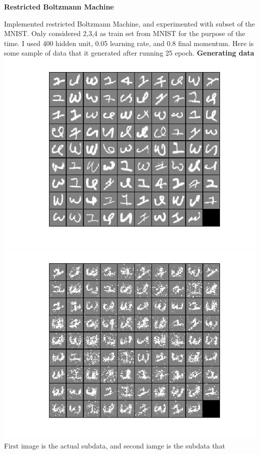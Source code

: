 \documentclass{article}
\begin{document}
\begin{center}
    {\bf Restricted Boltzmann Machine}
\end{center}
Implemented restricted Boltzmann Machine, and experimented with subset of the MNIST.
Only considered 2,3,4 as train set from MNIST for the purpose of the time. I used
400 hidden unit, 0.05 learning rate, and 0.8 final momentum.
Here is some sample of data that it generated after running 25 epoch.
{\bf Generating data}\\
\includegraphics[scale=0.4]{rbm_h400_l0.005_m0.8/subdata.jpg}
\includegraphics[scale=0.4]{rbm_h400_l0.005_m0.8/gensubdata_rbm.jpg}\\
First image is the actual subdata, and second iamge is the subdata that
\end{document}
